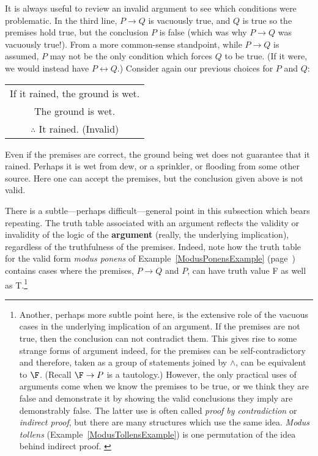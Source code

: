 It is always useful to review an invalid argument to see which
conditions were problematic.  In the third line,
$P\rightarrow Q$ is vacuously true, and $Q$ is true so the premises
hold true, but the conclusion $P$ is false (which was why
$P\rightarrow Q$ was vacuously true!).
From a more common-sense  standpoint, while $P\rightarrow Q$ is
assumed, 
$P$ may not be the only condition which forces $Q$ to be
true.  (If it were, we would instead have $P\longleftrightarrow Q$.)
Consider again our previous choices for $P$ and $Q$:
\begin{center}
\begin{tabular}{c}
If it rained, the ground is wet.\\
The ground is wet.\\
\hline
$\therefore$ It rained. (Invalid)
\end{tabular}
\end{center}
Even if the premises are correct,
the ground being wet does not guarantee that it rained.
Perhaps it is wet from dew, or a sprinkler, or flooding
from some other source.  Here one can accept the premises, 
but the conclusion given above is not valid.

There is a subtle---perhaps difficult---general point in
this subsection which
bears repeating.  The truth table associated with an argument
reflects the validity or invalidity of the logic of the
{\bf argument}
(really, the underlying implication),
regardless of the truthfulness of the premises.  Indeed,
note how the truth table for the valid form {\it modus ponens}
of Example~\ref{ModusPonensExample} (page~\pageref{ModusPonensExample})
contains cases where the premises, $P\longrightarrow Q$ and $P$,
can have truth value F as well as T.\footnote{%
Another, perhaps more subtle point here, is the extensive
role of the vacuous cases in the underlying implication
of an argument.  If the premises are not true, then
the conclusion can not contradict them.  This gives rise
to some strange forms of argument indeed, for the premises
can be self-contradictory and therefore, taken as a group
of statements joined by $\wedge$, can be equivalent to
$\F$.  (Recall $\F\rightarrow P$ is a tautology.)
However, the only practical uses of arguments come when
we know the premises to be true, or we think they are false and
demonstrate it by showing the valid conclusions they imply are 
demonstrably false.  The latter use is often called {\it proof
by contradiction} or {\it indirect proof}, but there are many
structures which use the same idea.  {\it Modus tollens} 
(Example~\ref{ModusTollensExample}) is one
permutation of the idea behind indirect proof.
\label{FootnoteOnVacuousCasesInArguments}}

